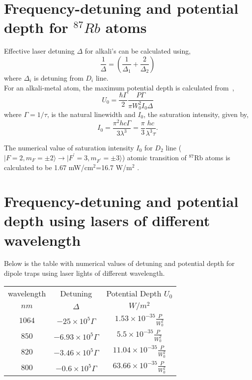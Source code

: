 \documentclass[amssymb,amsmath,aps,prl,twocolumn]{revtex4}
\begin{document}
\section{Frequency-detuning and potential depth for $^{87}Rb$ atoms} 

Effective laser detuning $\Delta$ for alkali's can be calculated using,
\begin{equation}
\frac{1}{\Delta}=\left(\frac{1}{\Delta_{1}}+\frac{2}{\Delta_{2}}\right)
\end{equation}
\noindent where $ \Delta_{i} $ is detuning from $D_{i}$ line.\\

For an alkali-metal atom, the maximum potential depth is calculated 
from~\cite{Cho},
\begin{equation}
U_{0}=\frac{\hbar\Gamma}{2}\frac{P\Gamma}{\pi W_{0}^{2}I_{0}\Delta}
\end{equation}
\noindent where $\Gamma=1/\tau$, is the natural linewidth and
$I_{0}$, the saturation intensity, given by,
\begin{equation}
I_{0}=\frac{\pi^{2}h c
\Gamma}{3\lambda^{3}}=\frac{\pi}{3}\frac{hc}{\lambda^{3}\tau}.
\end{equation}

The numerical value of saturation intensity $I_{0}$ for $D_{2}$ line
($|F=2, m_{F} = \pm2\rangle \rightarrow |F^{\prime}=3,
m_{F^{\prime}}=\pm 3 \rangle $) atomic transition of $^{87}$Rb
atoms is calculated to be 1.67 mW/cm$^{2}$=16.7 W/m$^{2}$ .

\section{Frequency-detuning and potential depth using lasers of different wavelength}

Below is the table with numerical values of detuning and potential
depth for dipole traps using laser lights of different
wavelength.\\

\begin{tabular}{|c|c|c|}
\hline
wavelength & Detuning & Potential Depth $U_{0}$ \\
$nm$       &  $\Delta$ &    $W/m^{2}$ \\
\hline
$1064$ & $-25\times10^{5}\Gamma$ & $1.53\times10^{-35}\frac{P}{W_{0}^{2}}$\\
$850$ & $-6.93\times10^{5}\Gamma$ & $5.5\times10^{-35}\frac{P}{W_{0}^{2}}$\\
$820$ & $-3.46\times10^{5}\Gamma$ & $11.04\times10^{-35}\frac{P}{W_{0}^{2}}$\\
$800$ & $-0.6\times10^{5}\Gamma$ & $63.66\times10^{-35}\frac{P}{W_{0}^{2}}$\\
\hline
\end{tabular}\\
\end{document}
